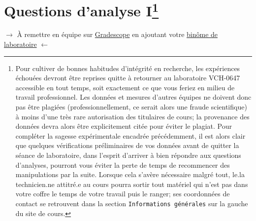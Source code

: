 \documentclass[canadien,12pt,oneside,letterpaper]{article}
\begin{document}

\vspace{-0.5cm}
\section[Questions d'analyse I]{Questions d'analyse I\footnote{Pour cultiver de bonnes habitudes d'intégrité en recherche, les expériences échouées devront être reprises quitte à retourner au laboratoire VCH-0647 accessible en tout temps, soit exactement ce que vous feriez en milieu de travail professionnel. Les données et mesures d'autres équipes ne doivent donc pas être plagiées (professionnellement, ce serait alors une fraude scientifique) à moins d'une très rare autorisation des titulaires de cours; la provenance des données devra alors être explicitement citée pour éviter le plagiat. Pour compléter la sagesse expérimentale encadrée précédemment, il est alors clair que quelques vérifications préliminaires de vos données avant de quitter la séance de laboratoire, dans l'esprit d'arriver à bien répondre aux questions d'analyses, pourront vous éviter la perte de temps de recommencer des manipulations par la suite. Lorsque cela s'avère nécessaire malgré tout, le.la technicien.ne attitré.e au cours pourra sortir tout matériel qui n'est pas dans votre coffre le temps de votre travail puis le ranger; ses coordonnées de contact se retrouvent dans la section \texttt{Informations générales} sur la gauche du site de cours.}} \label{sec:grade} 

\vspace{-0.5cm}
\noindent$\rightarrow$ À remettre en équipe sur \href{https://www.gradescope.com/}{Gradescope} en ajoutant votre \href{https://help.gradescope.com/article/m5qz2xsnjy-student-add-group-members}{binôme de laboratoire} $\leftarrow$

\end{document}

